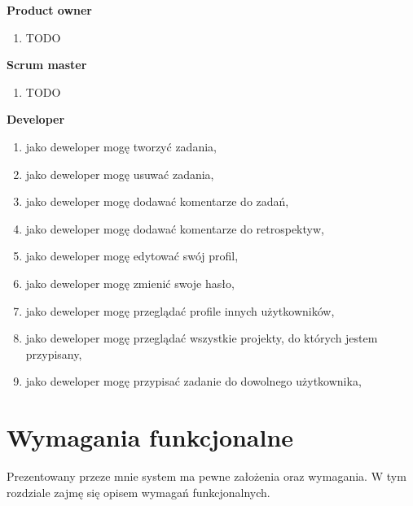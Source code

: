 \textbf{Product owner}
\begin{enumerate}		
	\item TODO
\end{enumerate}	
\textbf{Scrum master}
\begin{enumerate}		
	\item TODO
\end{enumerate}
\textbf{Developer}
\begin{enumerate}		
	\item jako deweloper mogę tworzyć zadania,
	\item jako deweloper mogę usuwać zadania,
	\item jako deweloper mogę dodawać komentarze do zadań,
	\item jako deweloper mogę dodawać komentarze do retrospektyw,
	\item jako deweloper mogę edytować swój profil,
	\item jako deweloper mogę zmienić swoje hasło,
	\item jako deweloper mogę przeglądać profile innych użytkowników,
	\item jako deweloper mogę przeglądać wszystkie projekty, do których jestem przypisany,
	\item jako deweloper mogę przypisać zadanie do dowolnego użytkownika,
	
\end{enumerate}

\section{Wymagania funkcjonalne}
Prezentowany przeze mnie system ma pewne założenia oraz wymagania. W tym rozdziale zajmę się opisem wymagań funkcjonalnych. 